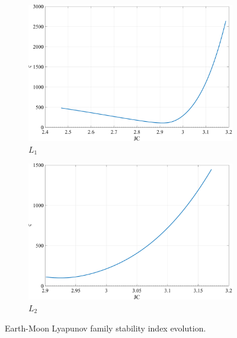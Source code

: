 \begin{figure}[ht]
    \begin{subfigure}[h]{0.4\linewidth}
        \includegraphics[width=\textwidth]{figures/L1LyapunovStability.pdf}
        \caption{$L_{1}$}
    \end{subfigure}
    \hfill
    \begin{subfigure}[h]{0.4\linewidth}
        \includegraphics[width=\textwidth]{figures/L2LyapunovStability.pdf}
        \caption{$L_{2}$}
    \end{subfigure}
    \caption{Earth-Moon Lyapunov family stability index evolution.}
    \label{fig:stability}
\end{figure}


